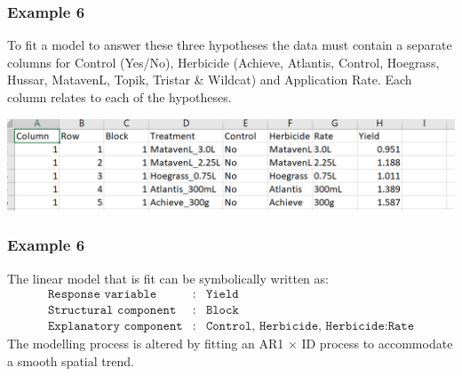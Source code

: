 \begin{frame}\frametitle{Example 6}
To fit a model to answer these three hypotheses the data must contain a separate columns for Control (Yes/No),
Herbicide (Achieve, Atlantis, Control, Hoegrass, Hussar, MatavenL, Topik, Tristar \& Wildcat) and Application Rate.
Each column relates to each of the hypotheses.

\begin{center}
\includegraphics[height = 0.3\textheight]{complextrt.png}
\end{center}

\end{frame}


\begin{frame}\frametitle{Example 6}
The linear model that is fit can be symbolically written as:
\begin{eqnarray*}
	\texttt{Response variable}&:& \texttt{Yield} \\
	\texttt{Structural component}&:& \texttt{Block}\\
	\texttt{Explanatory component}&:& \texttt{Control, Herbicide, Herbicide:Rate}
\end{eqnarray*}
The modelling process is altered by fitting an AR1 $\times$ ID process to accommodate a smooth spatial trend.

\end{frame}

